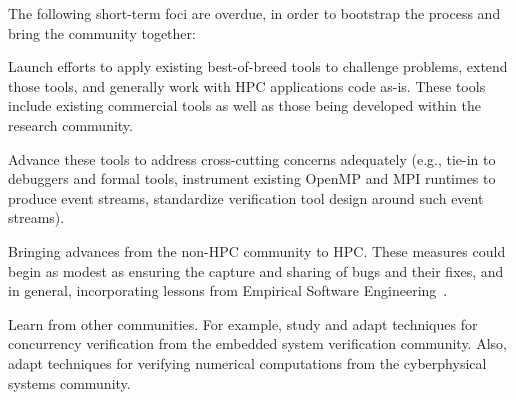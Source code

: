 \noindent The following short-term foci are overdue, in order to bootstrap the process and bring the community together:

\begin{compactitem}
\item Launch efforts to apply existing best-of-breed tools to challenge problems, extend those tools, and generally work with HPC applications code as-is.
%
These tools include existing commercial tools as well as those being developed within the research community.

\item Advance these tools to address cross-cutting concerns adequately (e.g., tie-in to debuggers and formal tools, instrument existing OpenMP and MPI runtimes to produce event streams, standardize verification tool design around such event streams).

\item Bringing advances from the non-HPC community to HPC. These measures could begin as modest as ensuring the capture and sharing of bugs and their fixes, and in general, incorporating lessons from Empirical Software Engineering~\cite{menzies-empirical-swe-SI2-2017}.

\item Learn
from other communities. 
For example, 
study and adapt techniques for concurrency verification from the embedded system verification community. Also, adapt techniques for verifying numerical computations from the cyberphysical systems community.
\end{compactitem}
